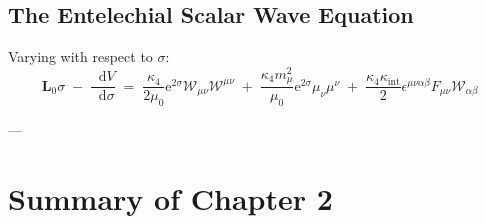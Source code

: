 \documentclass[
    12pt,
    a4paper,
    headings=normal,
    twoside=false,
    open=any,
    parskip=half
]{scrbook}
\newcommand{\diff}{\mathop{}\!\mathrm{d}}
\newcommand{\eu}{\mathrm{e}}
\begin{document}
\subsection{The Entelechial Scalar Wave Equation}
Varying with respect to $\sigma$:
\begin{equation}
\boxed{\mathbf{L}_0 \sigma \;-\; \frac{\diff V}{\diff\sigma} \;=\; \frac{\kappa_4}{2\mu_0} \eu^{2\sigma} \mathcal{W}_{\mu\nu}\mathcal{W}^{\mu\nu} \;+\; \frac{\kappa_4 m_\mu^2}{\mu_0} \eu^{2\sigma} \mu_\nu \mu^\nu \;+\; \frac{\kappa_4 \kappa_{\text{int}}}{2} \epsilon^{\mu\nu\alpha\beta} F_{\mu\nu} \mathcal{W}_{\alpha\beta}}
\label{eq:ch2_entelechial_wave_equation_master}
\end{equation}

---

\section{Summary of Chapter 2}
\end{document}
